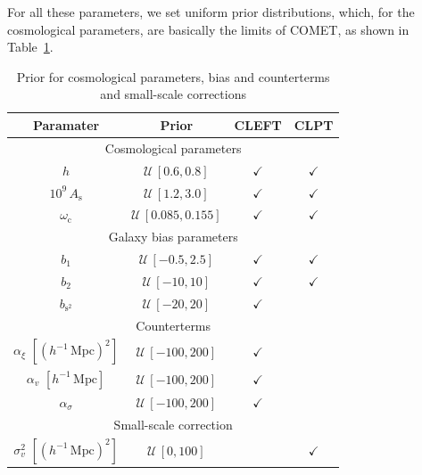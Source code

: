 \documentclass[12pt,a4paper,oneside]{report}
\begin{document}
For all these parameters, we set uniform prior distributions, which, for the cosmological parameters, are basically the limits of COMET, as shown in Table~\ref{tab:PriorTable}.

\begin{table}[ht]
    \centering
    \begin{tabular}{|c|c|c|c|}
        \hline
        \textbf{Paramater} & \textbf{Prior} & \textbf{CLEFT} & \textbf{CLPT} \\
        \hline
        \multicolumn{4}{|c|}{Cosmological parameters} \\
        \hline
        $h$ & $\mathcal{U}\,[0.6,0.8]$ & $\checkmark$ & $\checkmark$ \\
        \hline
        $10^9 \, A_\mathrm{s}$ & $\mathcal{U}\,[1.2,3.0]$ & $\checkmark$ & $\checkmark$ \\
        \hline
        $\omega_\mathrm{c}$ & $\mathcal{U}\,[0.085,0.155]$ & $\checkmark$ & $\checkmark$ \\
        \hline
        \multicolumn{4}{|c|}{Galaxy bias parameters} \\
        \hline
        $b_\mathrm{1}$ & $\mathcal{U}\,[-0.5,2.5]$ & $\checkmark$ & $\checkmark$ \\
        \hline
        $b_\mathrm{2}$ & $\mathcal{U}\,[-10,10]$ & $\checkmark$ & $\checkmark$ \\
        \hline
        $b_{\mathrm{s}^2}$ & $\mathcal{U}\,[-20,20]$ & $\checkmark$ &  \\
        \hline
        \multicolumn{4}{|c|}{Counterterms} \\
        \hline
        $\alpha_\xi$ $[(h^{-1} \, \mathrm{Mpc})^2]$ & $\mathcal{U}\,[-100,200]$ & $\checkmark$ &  \\
        \hline
        $\alpha_v$ $[h^{-1} \, \mathrm{Mpc}]$ & $\mathcal{U}\,[-100,200]$ & $\checkmark$ &  \\
        \hline
        $\alpha_\sigma$ & $\mathcal{U}\,[-100,200]$ & $\checkmark$ &  \\
        \hline
        \multicolumn{4}{|c|}{Small-scale correction} \\
        \hline
        $\sigma_v^2$ $[(h^{-1} \, \mathrm{Mpc})^2]$ & $\mathcal{U}\,[0,100]$ & & $\checkmark$ \\
        \hline
      \end{tabular}
      \caption{Prior for cosmological parameters, bias and counterterms and small-scale corrections}
    \label{tab:PriorTable}
\end{table}
\end{document}
